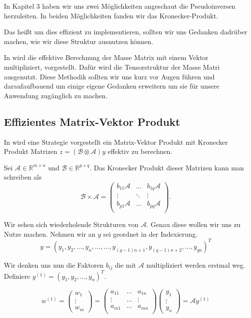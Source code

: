 In Kapitel 3 haben wir uns zwei Möglichkeiten angeschaut die Pseudoinversen herzuleiten. In beiden Möglichkeiten fanden wir das Kronecker-Produkt.

Das heißt um dies effizient zu implementieren, sollten wir uns Gedanken dadrüber machen, wie wir diese Struktur ausnutzen können.

In \cite{Teachlet} wird die effektive Berechnung der Masse Matrix mit einem Vektor multipliziert, vorgestellt. Dafür wird die Tensorstruktur der Masse Matri ausgenutzt. Diese Methodik sollten wir uns kurz vor Augen führen und daraufaufbauend um einige eigene Gedanken erweitern um sie für unsere Anwendung zugänglich zu machen.

\subsection{Effizientes Matrix-Vektor Produkt }
In \cite{Teachlet} wird eine Strategie vorgestellt ein Matrix-Vektor Produkt mit Kronecker Produkt Matrizen $z=(\mathcal{B} \otimes \mathcal{A})y$ effektiv zu berechnen.

Sei $\mathcal{A} \in \mathbb{R}^{m \times n}$ und $\mathcal{B} \in \mathbb{R}^{p \times q}$. Das Kronecker Produkt dieser Matrizen kann man schreiben als
\begin{equation*}
\mathcal{B} \times \mathcal{A} =
\begin{pmatrix}
b_{11}\mathcal{A} & \dots  & b_{1q}\mathcal{A} \\
\vdots & \ddots & \vdots \\
b_{p1}\mathcal{A} & \dots & b_{pq}\mathcal{A} \\
\end{pmatrix}.
\end{equation*}

Wir sehen sich wiederholende Strukturen von $\mathcal{A}$. Genau diese wollen wir uns zu Nutze machen. Nehmen wir an $y$ sei geordnet in der Indexierung.
\begin{equation*}
y = (y_1,y_2,\dots,y_n,\dots,\dots,y_{(q-1)n+1},y_{(q-1)n+2},\dots,y_{qn})^T
\end{equation*}

Wir denken uns nun die Faktoren $b_{ij}$ die mit $\mathcal{A}$ multipliziert werden erstmal weg. Definiere $y^{(1)}=(y_1,y_2,\dots,y_n)^T$.

\begin{equation*}
w^{(1)}=
\begin{pmatrix}
w_1 \\ \vdots \\ w_m 
\end{pmatrix}
=
\begin{pmatrix}
a_{11} & \dots & a_{1n} \\
\vdots & \dots & \vdots \\
a_{m1} & \dots & a_{mn} \\
\end{pmatrix}
\begin{pmatrix}
y_1 \\ \vdots \\ y_n
\end{pmatrix}
= \mathcal{A}y^{(1)}
\end{equation*}


